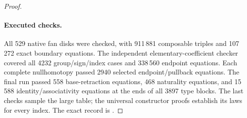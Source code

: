 \begin{proof}
\paragraph{Executed checks.}
All 529 native fan disks were checked, with 911\,881 composable
triples and 107\,272 exact boundary equations. The independent
elementary-coefficient checker covered all 4232 group/sign/index
cases and 338\,560 endpoint equations. Each complete nullhomotopy
passed 2940 selected endpoint/pullback equations. The final run
passed 558 base-retraction equations, 468 naturality equations,
and 15\,588 identity/associativity equations at the ends of all
3897 type blocks. The last checks sample the large table; the
universal constructor proofs establish its laws for every index.
The exact record is
.
\end{proof}
